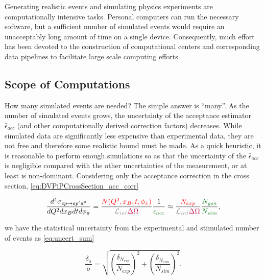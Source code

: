 Generating realistic \dvpip events and simulating physics experiments are computationally intensive tasks. Personal computers can run the necessary software, but a sufficient number of simulated events would require an unacceptably long amount of time on a single device. Consequently, much effort has been devoted to the construction of computational centers and corresponding data pipelines to facilitate large scale computing efforts. 

\subsection{Scope of Computations}

    How many simulated events are needed? The simple answer is ``many''. As the number of simulated events grows, the uncertainty of the acceptance estimator $\hat{\epsilon}_{acc}$ (and other computationally derived correction factors) decreases. While simulated data are significantly less expensive than experimental data, they are not free and therefore some realistic bound must be made. As a quick heuristic, it is reasonable to perform enough simulations so as that the uncertainty of the $\hat{\epsilon}_{acc}$ is negligible compared with the other uncertainties of the measurement, or at least is non-dominant. Considering only the acceptance correction in the cross section, \eqref{eq:DVPiPCrossSection_acc_corr}

    
     \begin{equation}\labelAndRemember{eq:DVPiPCrossSection_acc_corr}
           { \frac{    d^4\sigma_{  ep \rightarrow ep'\pi^0}   } {dQ^2dx_Bdtd\phi_{\pi}} 
                =   \frac{ \textcolor{red}{ N(Q^2,x_B,t,\phi_{\pi})}} {\Lumiint \textcolor{purple}{ \Delta \Omega}}
                \frac{1}{\textcolor{correctionfactors}{\epsilon_{acc}}} \approx \frac{ \textcolor{red}{ N_{exp} }} {\Lumiint \textcolor{purple}{ \Delta \Omega}}  \frac{\textcolor{correctionfactors}{N_{gen}}}{\textcolor{correctionfactors}{N_{sim}}}},
     \end{equation}     

     we have the statistical uncertainty from the experimental and stimulated number of events as \eqref{eq:uncert_sum}

    \begin{equation}\label{eq:uncert_sum}
               { 
               \frac{\delta_{\sigma}}{\sigma} = \sqrt{
                \left(\frac{\delta_{N_{exp}}}{N_{exp}} \right)^2+
                \left(\frac{\delta_{N_{sim}}}{N_{sim}} \right)^2 }               }.
         \end{equation}


